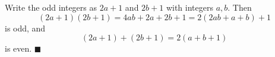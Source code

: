 Write the odd integers as $2a+1$ and $2b+1$ with integers $a,b$. Then
\[(2a+1)(2b+1)=4ab+2a+2b+1=2(2ab+a+b)+1\]
is odd, and
\[(2a+1)+(2b+1)=2(a+b+1)\]
is even. $\blacksquare$
